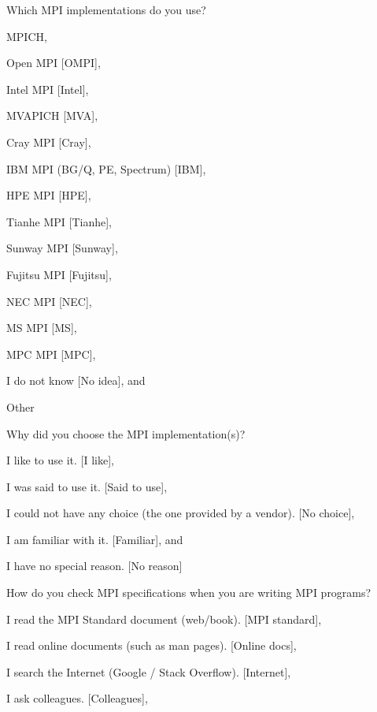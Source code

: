 \documentclass[preprint,5p,times]{elsarticle}
\begin{document}
{{\begin{description}[leftmargin=3mm]
\begin{inparaenum}[{\bf C}1)]
    \end{inparaenum}
  \item[Q12*:] Which MPI implementations do you use?
    \begin{inparaenum}[{\bf C}1)]
    \item MPICH,
    \item Open MPI [OMPI],
    \item Intel MPI [Intel],
    \item MVAPICH [MVA],
    \item Cray MPI [Cray],
    \item IBM MPI (BG/Q, PE, Spectrum) [IBM],
    \item HPE MPI [HPE],
    \item Tianhe MPI [Tianhe],
    \item Sunway MPI [Sunway],
    \item Fujitsu MPI [Fujitsu],
    \item NEC MPI [NEC],
    \item MS MPI [MS],
    \item MPC MPI [MPC],
    \item I do not know [No idea], and
    \item Other
    \end{inparaenum}
  \item[Q13:] Why did you choose the MPI implementation(s)?
    \begin{inparaenum}[{\bf C}1)]
    \item I like to use it. [I like],
    \item I was said to use it. [Said to use],
    \item I could not have any choice (the one provided by a vendor). [No choice],
    \item I am familiar with it. [Familiar], and
    \item I have no special reason. [No reason]
    \end{inparaenum}
  \item[Q14*:] How do you check MPI specifications when you are writing MPI programs?
    \begin{inparaenum}[{\bf C}1)]
    \item I read the MPI Standard document (web/book). [MPI standard],
    \item I read online documents (such as man pages). [Online docs],
    \item I search the Internet (Google / Stack Overflow). [Internet],
    \item I ask colleagues. [Colleagues],

\end{inparaenum}
\end{description}}}
\end{document}
